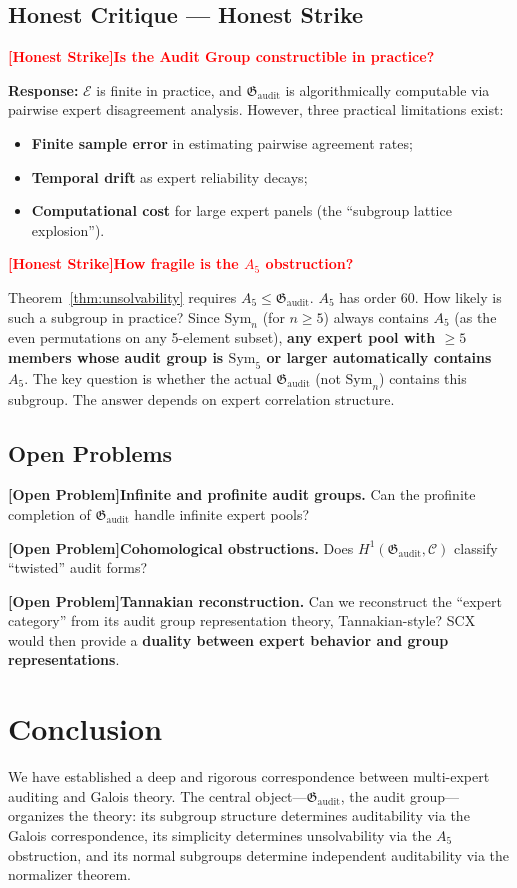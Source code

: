 \documentclass[12pt,a4paper]{article}
\theoremstyle{remark}
\newcommand{\Sym}{\mathrm{Sym}}
\newcommand{\AuditGrp}{\mathfrak{G}_{\mathrm{audit}}}
\newcommand{\ExpertSet}{\mathcal{E}}
\newcommand{\CEC}{\mathcal{C}}
\newcommand{\honestcrit}[1]{%
    \textcolor{red}{\textbf{[Honest Strike]#1}}%
}
\newcommand{\openproblem}{\textnormal{\textbf{[Open Problem]}}}
\begin{document}
\subsection{Honest Critique --- Honest Strike}
\honestcrit{Is the Audit Group constructible in practice?}

\textbf{Response:} \(\ExpertSet\) is finite in practice, and \(\AuditGrp\) is algorithmically computable via pairwise expert disagreement analysis. However, three practical limitations exist:
\begin{itemize}[itemsep=3pt]
    \item \textbf{Finite sample error} in estimating pairwise agreement rates;
    \item \textbf{Temporal drift} as expert reliability decays;
    \item \textbf{Computational cost} for large expert panels (the ``subgroup lattice explosion'').
\end{itemize}

\honestcrit{How fragile is the \(A_5\) obstruction?}

Theorem~\ref{thm:unsolvability} requires \(A_5 \leq \AuditGrp\). \(A_5\) has order 60. How likely is such a subgroup in practice? Since \(\Sym_n\) (for \(n \geq 5\)) always contains \(A_5\) (as the even permutations on any 5-element subset), \textbf{any expert pool with \(\geq 5\) members whose audit group is \(\Sym_5\) or larger automatically contains \(A_5\)}. The key question is whether the actual \(\AuditGrp\) (not \(\Sym_n\)) contains this subgroup. The answer depends on expert correlation structure.

\subsection{Open Problems}
\openproblem \textbf{Infinite and profinite audit groups.} Can the profinite completion of \(\AuditGrp\) handle infinite expert pools?

\openproblem \textbf{Cohomological obstructions.} Does \(H^1(\AuditGrp, \CEC)\) classify ``twisted'' audit forms?

\openproblem \textbf{Tannakian reconstruction.} Can we reconstruct the ``expert category'' from its audit group representation theory, Tannakian-style? SCX would then provide a \textbf{duality between expert behavior and group representations}.
\section{Conclusion}
We have established a deep and rigorous correspondence between multi-expert auditing and Galois theory. The central object---\(\AuditGrp\), the audit group---organizes the theory: its subgroup structure determines auditability via the Galois correspondence, its simplicity determines unsolvability via the \(A_5\) obstruction, and its normal subgroups determine independent auditability via the normalizer theorem.
\end{document}
